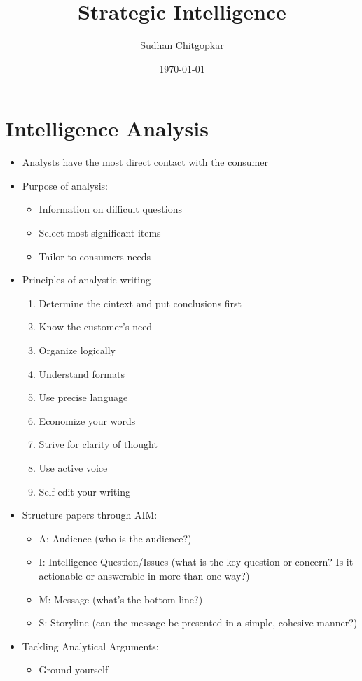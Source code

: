 \documentclass[11pt]{article}
\author{Sudhan Chitgopkar}
\date{\today}
\title{Strategic Intelligence}
\begin{document}
\maketitle
\tableofcontents \clearpage\section{Intelligence Analysis}
\label{sec:org56f785d}
\begin{itemize}
\item Analysts have the most direct contact with the consumer
\item Purpose of analysis:
\begin{itemize}
\item Information on difficult questions
\item Select most significant items
\item Tailor to consumers needs
\end{itemize}
\item Principles of analystic writing
\begin{enumerate}
\item Determine the cintext and put conclusions first
\item Know the customer's need
\item Organize logically
\item Understand formats
\item Use precise language
\item Economize your words
\item Strive for clarity of thought
\item Use active voice
\item Self-edit your writing
\end{enumerate}
\item Structure papers through AIM:
\begin{itemize}
\item A: Audience (who is the audience?)
\item I: Intelligence Question/Issues (what is the key question or concern? Is it actionable or answerable in more than one way?)
\item M: Message (what's the bottom line?)
\item S: Storyline (can the message be presented in a simple, cohesive manner?)
\end{itemize}
\item Tackling Analytical Arguments:
\begin{itemize}
\item Ground yourself

\end{itemize}
\end{itemize}
\end{document}
